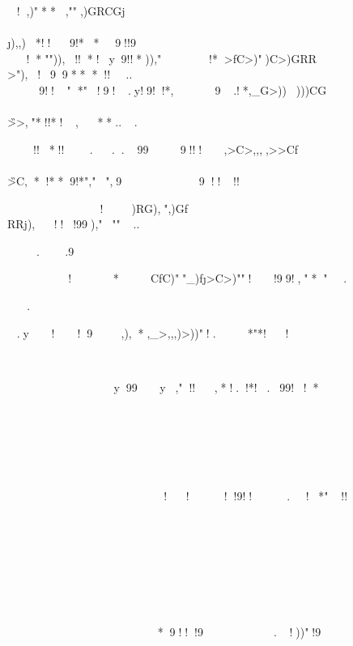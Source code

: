 !,)"**,"",)GRCGj\\\\\j),,)*!!9!**9!!9		

!*"")),!!*!y9!!*)),"!*>fC>)")C>)GRR\\\RR>"),!99***!!..
9!!"*"!9!.y!9!!*,9.!*,_G>)))))CG\\\\\G>>,"*!!*!,**...
	

	!!*!!...999!!!,>C>,,,,>>Cf\\\\\G>C,*!**9!*","",9
	
9!!!!


!)RG),",)Gf\\RRj),!!!99),"""..
	



..9


!
*CfC)""_)f\j>C>)""!!99!,"*".
	


	
.	


.y!%
!9,),*,_>,,,)>))"!.*"*!!




		

	



		
y99y,"!!,*!.!*!.99!!*



	






	%
%
	








			



	
	!!!!9!!.!*"!!	


	







	%











	*9!!!9
.!))"!9

